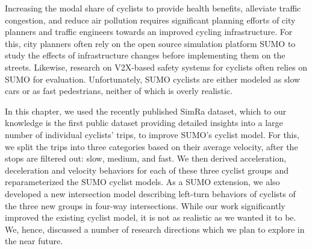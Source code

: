 Increasing the modal share of cyclists to provide health benefits, alleviate traffic congestion, and reduce air pollution requires significant planning efforts of city planners and traffic engineers towards an improved cycling infrastructure.
For this, city planners often rely on the open source simulation platform SUMO to study the effects of infrastructure changes before implementing them on the streets.
Likewise, research on V2X-based safety systems for cyclists often relies on SUMO for evaluation.
Unfortunately, SUMO cyclists are either modeled as slow cars or as fast pedestrians, neither of which is overly realistic.

In this chapter, we used the recently published SimRa dataset, which to our knowledge is the first public dataset providing detailed insights into a large number of individual cyclists' trips, to improve SUMO's cyclist model.
For this, we split the trips into three categories based on their average velocity, after the stops are filtered out: slow, medium, and fast.
We then derived acceleration, deceleration and velocity behaviors for each of these three cyclist groups and reparameterized the SUMO cyclist models.
As a SUMO extension, we also developed a new intersection model describing left-turn behaviors of cyclists of the three new groups in four-way intersections.
While our work significantly improved the existing cyclist model, it is not as realistic as we wanted it to be.
We, hence, discussed a number of research directions which we plan to explore in the near future.
